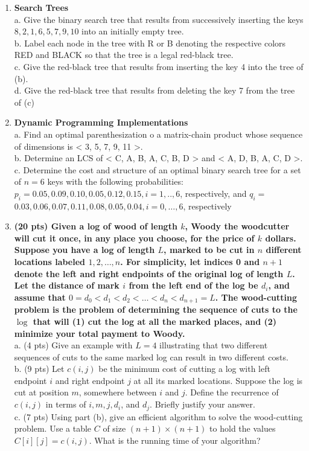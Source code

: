\documentclass[a4paper,11pt,oneside]{book}
\begin{document}
\begin{enumerate}
  \item {\textbf{Search Trees}}
  \\ a. Give the binary search tree that results from successively inserting the keys $8,2,1,6,5,7,9,10$ into an initially empty tree.
  \\ b. Label each node in the tree with $\mathrm{R}$ or B denoting the respective colors RED and BLACK so that the tree is a legal red-black tree.
  \\ c. Give the red-black tree that results from inserting the key 4 into the tree of (b).
  \\ d. Give the red-black tree that results from deleting the key 7 from the tree of (c)
  
  \item {\textbf{Dynamic Programming Implementations}}
  \\ a. Find an optimal parenthesization o a matrix-chain product whose sequence of dimensions is < 3, 5, 7, 9, 11 >.
  \\ b. Determine an LCS of < C, A, B, A, C, B, D > and < A, D, B, A, C, D >.
  \\ c. Determine the cost and structure of an optimal binary search tree for a set of $n=6$ keys with the following probabilities: $p_i=0.05,0.09,0.10,0.05,0.12,0.15, i=1, . ., 6$, respectively, and $q_i=$ $0.03,0.06,0.07,0.11,0.08,0.05,0.04, i=0, \ldots, 6$, respectively
  
  \item {\textbf{(20 pts) Given a log of wood of length $k$, Woody the woodcutter will cut it once, in any place you choose, for the price of $k$ dollars. Suppose you have a log of length $L$, marked to be cut in $n$ different locations labeled $1,2, \ldots, n$. For simplicity, let indices 0 and $n+1$ denote the left and right endpoints of the original log of length $L$. Let the distance of mark $i$ from the left end of the log be $d_i$, and assume that $0=d_0<d_1<d_2<\ldots<d_n<d_{n+1}=L$. The wood-cutting problem is the problem of determining the sequence of cuts to the $\log$ that will (1) cut the log at all the marked places, and (2) minimize your total payment to Woody.}}
  \\ a. (4 pts) Give an example with $L=4$ illustrating that two different sequences of cuts to the same marked log can result in two different costs.
  \\ b. (9 pts) Let $c(i, j)$ be the minimum cost of cutting a log with left endpoint $i$ and right endpoint $j$ at all its marked locations. Suppose the log is cut at position $m$, somewhere between $i$ and $j$. Define the recurrence of $c(i, j)$ in terms of $i, m, j, d_i$, and $d_j$. Briefly justify your answer.
  \\ c. (7 pts) Using part (b), give an efficient algorithm to solve the wood-cutting problem. Use a table $C$ of size $(n+1) \times(n+1)$ to hold the values $C[i][j]=c(i, j)$. What is the running time of your algorithm?
  

\end{enumerate}
\end{document}
